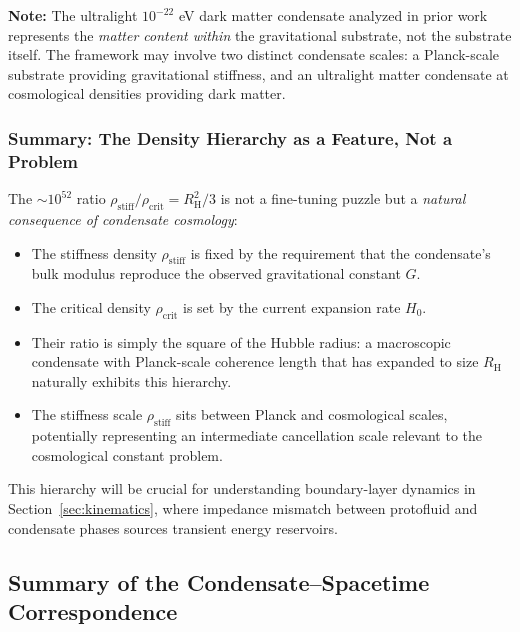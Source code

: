 \documentclass[11pt,a4paper]{article}
\newcommand{\rhocrit}{\rho_{\mathrm{crit}}}
\newcommand{\rhostiff}{\rho_{\mathrm{stiff}}}
\newcommand{\RH}{R_{\mathrm{H}}}
\theoremstyle{definition}
\begin{document}
\textbf{Note:} The ultralight $10^{-22}$ eV dark matter condensate analyzed in prior work \cite{SkavbergPlanckField2025} represents the \emph{matter content within} the gravitational substrate, not the substrate itself. The framework may involve two distinct condensate scales: a Planck-scale substrate providing gravitational stiffness, and an ultralight matter condensate at cosmological densities providing dark matter.

\subsubsection{Summary: The Density Hierarchy as a Feature, Not a Problem}
\label{sec:hierarchy_summary}

The $\sim 10^{52}$ ratio $\rhostiff/\rhocrit = \RH^2/3$ is not a fine-tuning puzzle but a \emph{natural consequence of condensate cosmology}:

\begin{itemize}[leftmargin=1.8em]
  \item The stiffness density $\rhostiff$ is fixed by the requirement that the condensate's bulk modulus reproduce the observed gravitational constant $G$.
  \item The critical density $\rhocrit$ is set by the current expansion rate $H_0$.
  \item Their ratio is simply the square of the Hubble radius: a macroscopic condensate with Planck-scale coherence length that has expanded to size $\RH$ naturally exhibits this hierarchy.
  \item The stiffness scale $\rhostiff$ sits between Planck and cosmological scales, potentially representing an intermediate cancellation scale relevant to the cosmological constant problem.
\end{itemize}

This hierarchy will be crucial for understanding boundary-layer dynamics in Section~\ref{sec:kinematics}, where impedance mismatch between protofluid and condensate phases sources transient energy reservoirs.

\subsection{Summary of the Condensate--Spacetime Correspondence}
\label{sec:bridge_summary}
\end{document}
